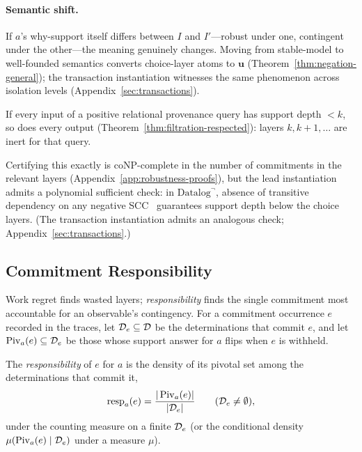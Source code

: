 \paragraph{Semantic shift.}
If $a$'s why-support itself differs between $I$ and $I'$---robust under one,
contingent under the other---the meaning genuinely changes. Moving from
stable-model to well-founded semantics converts choice-layer atoms to
$\mathbf{u}$ (Theorem~\ref{thm:negation-general}); the transaction
instantiation witnesses the same phenomenon across isolation levels
(Appendix~\ref{sec:transactions}).

\begin{proposition}
  \label{prop:depth-bound}
  If every input of a positive relational provenance query has support depth
  $< k$, so does every output
  (Theorem~\ref{thm:filtration-respected}): layers $k, k{+}1, \dots$ are inert
  for that query.
\end{proposition}

\noindent
Certifying this exactly is coNP-complete in the number of commitments in the
relevant layers (Appendix~\ref{app:robustness-proofs}), but the lead
instantiation admits a polynomial sufficient check: in $\mbox{Datalog}^\neg$,
absence of transitive dependency on any negative SCC~\cite{gebser2012asp}
guarantees support depth below the choice layers. (The transaction
instantiation admits an analogous check; Appendix~\ref{sec:transactions}.)

\subsection{Commitment Responsibility}
\label{sec:responsibility}

Work regret finds wasted layers; \emph{responsibility} finds the single
commitment most accountable for an observable's contingency. For a commitment
occurrence $e$ recorded in the traces, let $\mathcal{D}_e \subseteq \mathcal{D}$ be the
determinations that commit $e$, and let $\operatorname{Piv}_a(e) \subseteq
\mathcal{D}_e$ be those whose support answer for $a$ flips when $e$ is withheld.

\begin{definition}
  \label{def:responsibility}
  The \emph{responsibility} of $e$ for $a$ is the density of its pivotal set
  among the determinations that commit it,
  \[
    \operatorname{resp}_a(e)
    = \frac{|\operatorname{Piv}_a(e)|}{|\mathcal{D}_e|}
    \qquad (\mathcal{D}_e \neq \emptyset),
  \]
  under the counting measure on a finite $\mathcal{D}_e$ (or the conditional density
  $\mu(\operatorname{Piv}_a(e) \mid \mathcal{D}_e)$ under a measure $\mu$).
\end{definition}


